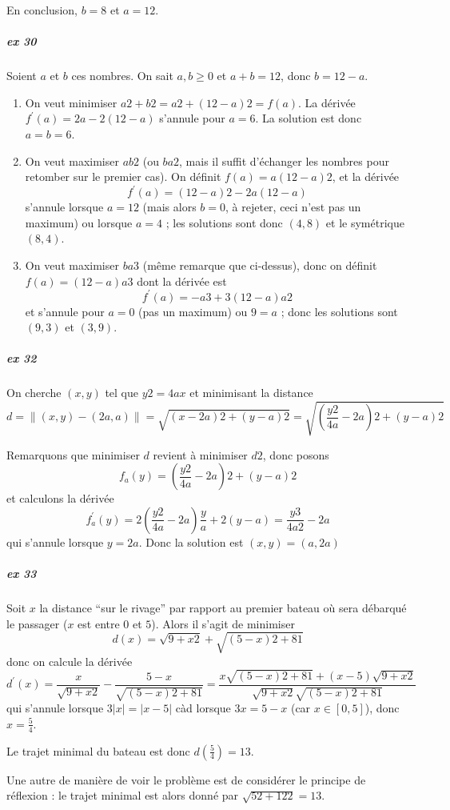 En conclusion, $b = 8$ et $a = 12$.

\subparagraph{ex 30} Soient $a$ et $b$ ces nombres. On sait $a, b \geq
0$ et $a+b = 12$, donc $b = 12 - a$.
\begin{enumerate}
\item On veut minimiser $a2+ b2 = a2 + (12-a)2 = f(a)$. La dérivée
  $f^\prime(a) = 2a - 2 (12 - a)$ s'annule pour $a = 6$. La solution
  est donc $a = b = 6$.

\item On veut maximiser $a b2$ (ou $ba2$, mais il suffit d'échanger
  les nombres pour retomber sur le premier cas). On définit $f(a) = a
  (12-a)2$, et la dérivée
  \begin{equation*}
    f^\prime(a) = (12-a)2 - 2 a (12-a)
  \end{equation*}
  s'annule lorsque $a = 12$ (mais alors $b = 0$, à rejeter, ceci n'est
  pas un maximum) ou lorsque $a = 4$ ; les solutions sont donc $(4,8)$
  et le symétrique $(8,4)$.

\item On veut maximiser $ba3$ (même remarque que ci-dessus), donc on
  définit
  \begin{math}
    f(a) = (12-a) a3
  \end{math}
  dont la dérivée est
  \begin{equation*}
    f^\prime(a) = -a3 + 3 (12-a)a2
  \end{equation*}
  et s'annule pour $a = 0$ (pas un maximum) ou $9 = a$ ; donc les
  solutions sont $(9,3)$ et $(3,9)$.
\end{enumerate}

\subparagraph{ex 32}
On cherche $(x,y)$ tel que $y2 = 4ax$ et minimisant la distance
\begin{equation*}
d = \| (x,y)-(2a,a) \| = \sqrt{(x-2a)2 + (y-a)2} =
\sqrt{\left(\frac{y2}{4a}-2a\right)2 + (y-a)2}
\end{equation*}

Remarquons que minimiser $d$ revient à minimiser $d2$, donc posons
\begin{equation*}
f_a(y) = \left(\frac{y2}{4a}-2a\right)2 + (y-a)2
\end{equation*}
et calculons la dérivée
\begin{equation*}
  f_a^\prime(y)  = 2 \left(\frac{y2}{4a}-2a\right) \frac y a + 2
  (y-a) = \frac{y3}{4a2}-2a
\end{equation*}
qui s'annule lorsque $y = 2a$. Donc la solution est $(x,y) = (a,2a)$

\subparagraph{ex 33}
Soit $x$ la distance ``sur le rivage'' par rapport au premier bateau
où sera débarqué le passager ($x$ est entre $0$ et $5$). Alors il
s'agit de minimiser
\begin{equation*}
  d(x) = \sqrt{9+x2} + \sqrt{(5-x)2 + 81}
\end{equation*}
donc on calcule la dérivée
\begin{equation*}
  d^\prime(x) = \frac{x}{\sqrt{9+x2}} - \frac{5-x}{\sqrt{(5-x)2 + 81}}
 = \frac{x\sqrt{(5-x)2 + 81} + (x-5)\sqrt{9+x2}}{\sqrt{9+x2}\sqrt{(5-x)2 + 81}}
\end{equation*}
qui s'annule lorsque $3 |x| = |x-5|$ càd lorsque $3x = 5 - x$
(car $x \in [0,5]$), donc $x = \frac{5}{4}$.

Le trajet minimal du bateau est donc $d(\frac{5}{4}) = 13$.

Une autre de manière de voir le problème est de considérer le principe
de réflexion : le trajet minimal est alors donné par $\sqrt{52 +
  122} = 13$.

